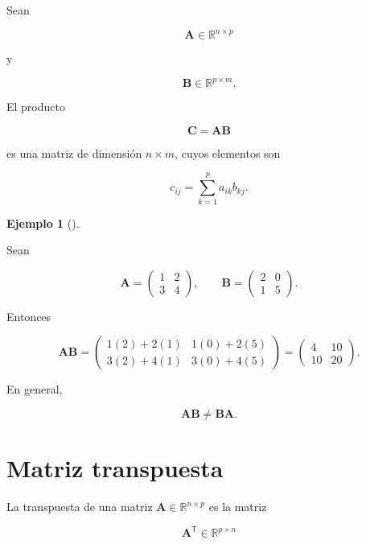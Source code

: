 \documentclass[
  spanish,
  10.5pt,
  letterpaper,
  DIV=11,
  numbers=noendperiod,
  oneside,
  open=any]{scrreprt}
\theoremstyle{definition}
\theoremstyle{definition}
\newtheorem{example}{Ejemplo}[chapter]
\theoremstyle{plain}
\theoremstyle{remark}
\begin{document}

Sean

\[
\mathbf{A}\in\mathbb{R}^{n\times p}
\]

y

\[
\mathbf{B}\in\mathbb{R}^{p\times m}.
\]

El producto

\[
\mathbf{C}
=
\mathbf{A}\mathbf{B}
\]

es una matriz de dimensión \(n\times m\), cuyos elementos son

\[
c_{ij}
=
\sum_{k=1}^{p}
a_{ik}b_{kj}.
\]

\begin{example}[]\protect\hypertarget{exm-producto-matricial}{}\label{exm-producto-matricial}

Sean

\[
\mathbf{A}
=
\begin{pmatrix}
1 & 2\\
3 & 4
\end{pmatrix},
\qquad
\mathbf{B}
=
\begin{pmatrix}
2 & 0\\
1 & 5
\end{pmatrix}.
\]

Entonces

\[
\mathbf{A}\mathbf{B}
=
\begin{pmatrix}
1(2)+2(1) & 1(0)+2(5)\\
3(2)+4(1) & 3(0)+4(5)
\end{pmatrix}
=
\begin{pmatrix}
4 & 10\\
10 & 20
\end{pmatrix}.
\]

\end{example}

En general,

\[
\mathbf{A}\mathbf{B}
\neq
\mathbf{B}\mathbf{A}.
\]

\section*{Matriz transpuesta}\label{matriz-transpuesta}


La transpuesta de una matriz \(\mathbf{A}\in\mathbb{R}^{n\times p}\) es
la matriz

\[
\mathbf{A}^{\mathsf T}\in\mathbb{R}^{p\times n}
\]
\end{document}
